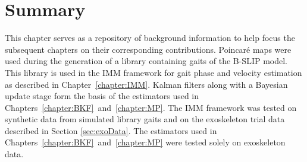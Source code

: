 \section{Summary}
This chapter serves as a repository of background information to help focus the subsequent chapters on their corresponding contributions. Poincar\'e maps were used during the generation of a library containing gaits of the B-SLIP model. This library is used in the IMM framework for gait phase and velocity estimation as described in Chapter~\ref{chapter:IMM}. Kalman filters along with a Bayesian update stage form the basis of the estimators used in Chapters~\ref{chapter:BKF}~and~\ref{chapter:MP}. The IMM framework was tested on synthetic data from simulated library gaits and on the exoskeleton trial data described in Section \ref{sec:exoData}. The estimators used in Chapters~\ref{chapter:BKF}~and~\ref{chapter:MP} were tested solely on exoskeleton data.
